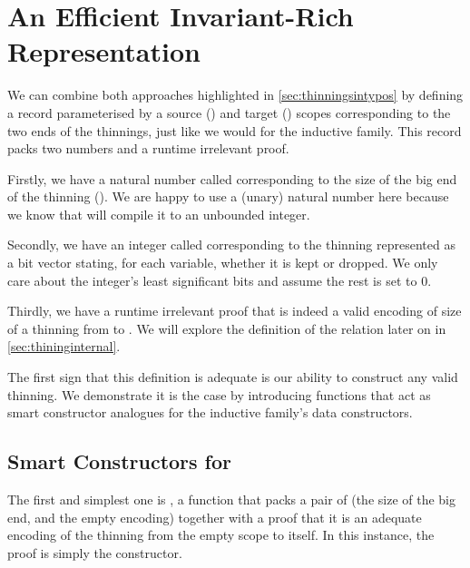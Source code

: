 
\section{An Efficient Invariant-Rich Representation}\label{sec:efficient}

We can combine both approaches highlighted in \cref{sec:thinningsintypos}
by defining a record parameterised by a source
() and target () scopes corresponding to the two
ends of the thinnings, just like we would for the inductive family. This record
packs two numbers and a runtime irrelevant proof.

Firstly, we have a natural number called  corresponding
to the size of the big end of the thinning ().
%
We are happy to use a (unary) natural number here because we know that \idris{}
will compile it to an unbounded integer.

Secondly, we have an integer called  corresponding to
the thinning represented as a bit vector stating, for each variable, whether
it is kept or dropped. We only care about the integer's 
least significant bits and assume the rest is set to 0.

Thirdly, we have a runtime irrelevant proof  that
 is indeed a valid encoding of size 
of a thinning from  to . We will explore the
definition of the relation  later on
in \cref{sec:thininginternal}.


The first sign that this definition is adequate is our ability to construct
any valid thinning. We demonstrate it is the case by introducing functions
that act as smart constructor analogues for the inductive family's data
constructors.

\subsection{Smart Constructors for }

The first and simplest one is , a function that packs a pair of
 (the size of the big end, and the empty encoding) together with a proof
that it is an adequate encoding of the thinning from the empty scope to itself.
In this instance, the proof is simply the  constructor.

